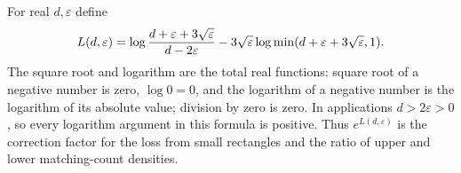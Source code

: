 \begin{definition}
For real $d,\varepsilon$ define
\[
 L(d,\varepsilon)=\log{d+\varepsilon+3\sqrt\varepsilon\over d-2\varepsilon}
 -3\sqrt\varepsilon\log\min(d+\varepsilon+3\sqrt\varepsilon,1).
\]
The square root and logarithm are the total real functions: square root
of a negative number is zero, $\log0=0$, and the logarithm of a negative
number is the logarithm of its absolute value; division by zero is zero.
In applications $d>2\varepsilon>0$, so every
logarithm argument in this formula is positive. Thus $e^{L(d,\varepsilon)}$
is the correction factor for the loss from small rectangles and the
ratio of upper and lower matching-count densities.
\end{definition}
